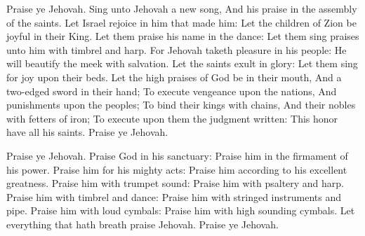 Praise ye Jehovah. Sing unto Jehovah a new song, And his praise in the assembly of the saints.  Let Israel rejoice in him that made him: Let the children of Zion be joyful in their King.  Let them praise his name in the dance: Let them sing praises unto him with timbrel and harp.  For Jehovah taketh pleasure in his people: He will beautify the meek with salvation.  Let the saints exult in glory: Let them sing for joy upon their beds.  Let the high praises of God be in their mouth, And a two-edged sword in their hand;  To execute vengeance upon the nations, And punishments upon the peoples;  To bind their kings with chains, And their nobles with fetters of iron;  To execute upon them the judgment written: This honor have all his saints. Praise ye Jehovah. 

Praise ye Jehovah. Praise God in his sanctuary: Praise him in the firmament of his power.  Praise him for his mighty acts: Praise him according to his excellent greatness.  Praise him with trumpet sound: Praise him with psaltery and harp.  Praise him with timbrel and dance: Praise him with stringed instruments and pipe.  Praise him with loud cymbals: Praise him with high sounding cymbals.  Let everything that hath breath praise Jehovah. Praise ye Jehovah. 